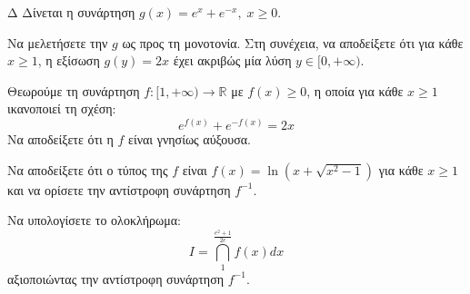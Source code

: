 \begin{thema}{Δ}
Δίνεται η συνάρτηση $g(x) = e^x + e^{-x}, \; x \ge 0$.
\begin{erwthma}
    \item Να μελετήσετε την $g$ ως προς τη μονοτονία. Στη συνέχεια, να αποδείξετε ότι για κάθε $x \ge 1$, η εξίσωση $g(y) = 2x$ έχει ακριβώς μία λύση $y \in [0, +\infty)$.
    \item Θεωρούμε τη συνάρτηση $f: [1, +\infty) \to \mathbb{R}$ με $f(x) \ge 0$, η οποία για κάθε $x \ge 1$ ικανοποιεί τη σχέση:
    \[ e^{f(x)} + e^{-f(x)} = 2x \]
    Να αποδείξετε ότι η $f$ είναι γνησίως αύξουσα.
    \item Να αποδείξετε ότι ο τύπος της $f$ είναι $\displaystyle f(x) = \ln\left(x + \sqrt{x^2-1}\right)$ για κάθε $x \ge 1$ και να ορίσετε την αντίστροφη συνάρτηση $f^{-1}$.
    \item Να υπολογίσετε το ολοκλήρωμα:
    \[ I = \dint_1^{\frac{e^2+1}{2e}} f(x) dx \]
    αξιοποιώντας την αντίστροφη συνάρτηση $f^{-1}$.
\end{erwthma}
\end{thema}
